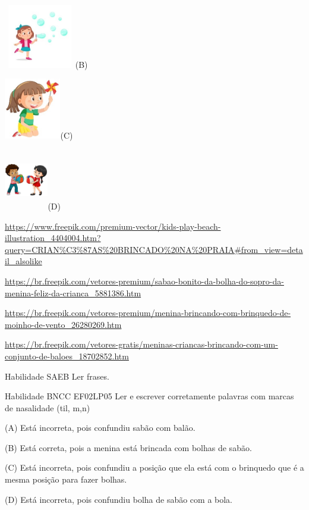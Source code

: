 {{\includegraphics[width=1.23681in,height=1.10139in]{media/image79.jpeg}(B)

\includegraphics[width=0.97361in,height=1.05069in]{media/image80.jpeg}(C)

\includegraphics[width=0.75437in,height=1.04404in]{media/image81.jpeg}(D)

\url{https://www.freepik.com/premium-vector/kids-play-beach-illustration_4404004.htm?query=CRIAN\%C3\%87AS\%20BRINCADO\%20NA\%20PRAIA\#from_view=detail_alsolike}

\url{https://br.freepik.com/vetores-premium/sabao-bonito-da-bolha-do-sopro-da-menina-feliz-da-crianca_5881386.htm}

\url{https://br.freepik.com/vetores-premium/menina-brincando-com-brinquedo-de-moinho-de-vento_26280269.htm}

\url{https://br.freepik.com/vetores-gratis/meninas-criancas-brincando-com-um-conjunto-de-baloes_18702852.htm}

Habilidade SAEB Ler frases.

Habilidade BNCC EF02LP05 Ler e escrever corretamente palavras com marcas
de nasalidade (til, m,n)

(A) Está incorreta, pois confundiu sabão com balão.

(B) Está correta, pois a menina está brincada com bolhas de sabão.

(C) Está incorreta, pois confundiu a posição que ela está com o
brinquedo que é a mesma posição para fazer bolhas.

(D) Está incorreta, pois confundiu bolha de sabão com a bola.

}}

